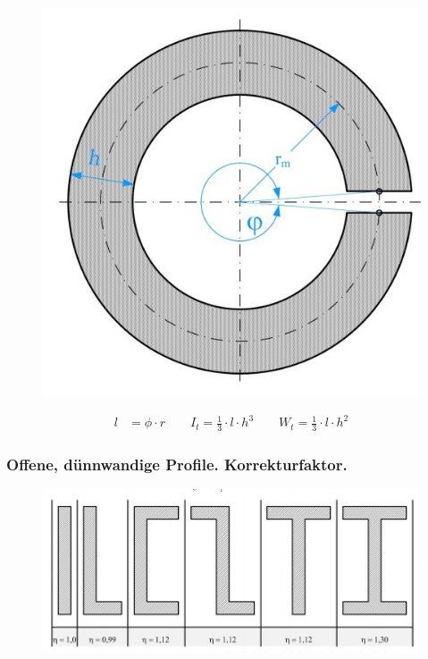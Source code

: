 \begin{figure}[h]
	\centering
	\includegraphics[scale=0.6]{Torsion_4.jpg}
\end{figure}


\begin{align*}
l &= \phi \cdot r \qquad
I_t = \frac{1}{3} \cdot l \cdot h^3 \qquad
W_t = \frac{1}{3} \cdot l \cdot h^2
\end{align*}

\newpage

\subsubsection*{Offene, dünnwandige Profile. Korrekturfaktor.}


\begin{figure}[h]
	\centering
	\includegraphics[scale=0.6]{Torsion_5.jpg}
\end{figure}


